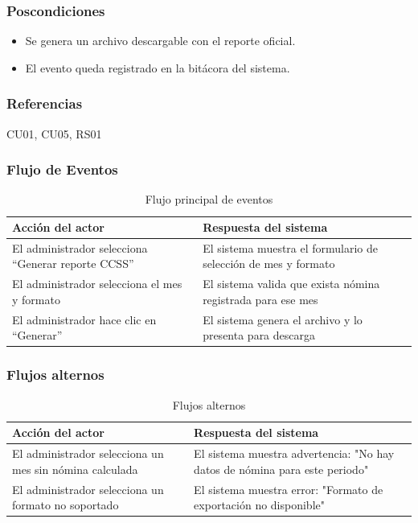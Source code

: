 \subsubsection*{Poscondiciones}
\begin{itemize}
	\item Se genera un archivo descargable con el reporte oficial.
	\item El evento queda registrado en la bitácora del sistema.
\end{itemize}

\subsubsection*{Referencias}
CU01, CU05, RS01

\subsubsection*{Flujo de Eventos}
\begin{table}[h]
	\centering
	\caption{Flujo principal de eventos}
	\begin{tabular}{|p{7cm}|p{7cm}|}
		\hline
		\textbf{Acción del actor}                          & \textbf{Respuesta del sistema}                                 \\ \hline
		El administrador selecciona “Generar reporte CCSS” & El sistema muestra el formulario de selección de mes y formato \\ \hline
		El administrador selecciona el mes y formato       & El sistema valida que exista nómina registrada para ese mes    \\ \hline
		El administrador hace clic en “Generar”            & El sistema genera el archivo y lo presenta para descarga       \\ \hline
	\end{tabular}
\end{table}

\subsubsection*{Flujos alternos}
\begin{table}[h]
	\centering
	\caption{Flujos alternos}
	\begin{tabular}{|p{7cm}|p{7cm}|}
		\hline
		\textbf{Acción del actor}                               & \textbf{Respuesta del sistema}                                             \\ \hline
		El administrador selecciona un mes sin nómina calculada & El sistema muestra advertencia: "No hay datos de nómina para este periodo" \\ \hline
		El administrador selecciona un formato no soportado     & El sistema muestra error: "Formato de exportación no disponible"           \\ \hline
	\end{tabular}
\end{table}

